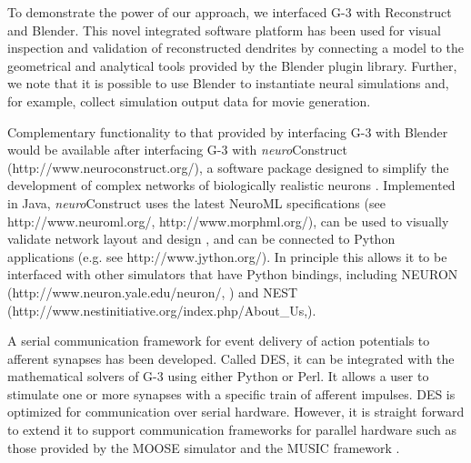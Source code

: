 \documentclass[10pt]{article}
\begin{document}
To demonstrate the power of our approach, we
interfaced G-3 with Reconstruct and Blender. This novel integrated software
platform has been used for visual inspection and validation of
reconstructed dendrites by connecting a model to the geometrical and
analytical tools provided by the Blender plugin library.  Further, we
note that it is possible to use Blender to instantiate neural
simulations and, for example, collect simulation output data for
movie generation.  

Complementary functionality to that provided by interfacing G-3 with
Blender would be available after interfacing G-3 with {\it
  neuro}Construct (http://www.neuroconstruct.org/), a software package
designed to simplify the development of complex networks of
biologically realistic neurons \cite{gleeson10:neuroml,
  gleeson07}.  Implemented in Java, {\it neuro}Construct uses the
latest NeuroML specifications (see http://www.neuroml.org/,
http://www.morphml.org/), can be used to visually validate network
layout and design \cite{crook07:_morph}, and can be connected to
Python applications (e.g.  see http://www.jython.org/).  In principle
this allows it to be interfaced with other simulators that have Python
bindings, including NEURON  (http://www.neuron.yale.edu/neuron/, \cite{m93:_neural_system}) and NEST (http://www.nest\-initiative.org/index.php/About\_Us,\cite{diesmann01}).

A serial communication framework for event delivery of action
potentials to afferent synapses has been developed.  Called
DES, it can be integrated
with the mathematical solvers of G-3 using either Python or Perl. It allows a user to stimulate one or more synapses with a specific train of afferent impulses.
DES is optimized for communication over serial hardware. However, it is straight forward
to extend it to support communication frameworks for parallel
hardware such as those provided by the MOOSE
simulator \cite{ray08:_pymoos} and the MUSIC
framework \cite{djurfeldt10:_run_time_inter_between_neuron}.
\end{document}
